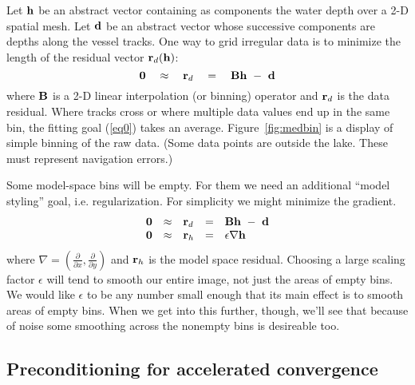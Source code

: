 Let $\bold{h}$ be an abstract vector containing as components
the water depth over a 2-D spatial mesh.
Let $\bold{d}$ be an abstract vector whose successive components
are depths along the vessel tracks.
One way to grid irregular data is to minimize the length 
of the residual vector $\bold r_d(\bold h)$:
\begin{equation}
	\bold 0 \quad\approx\quad \bold r_d \quad=\quad \bold B \bold h \ -\  \bold d    \label{eq0}
\end{equation}
where $\bold B$ is a 2-D linear interpolation (or binning) operator 
and $\bold r_d$ is the data residual.
Where tracks cross or where multiple data values end up in the same bin,
the fitting goal (\ref{eq0}) takes an average.
Figure~\ref{fig:medbin}
is a display of simple binning of the raw data.
(Some data points are outside the lake.
These must represent navigation errors.)


\par

Some model-space bins will be empty.
For them we need an additional ``model styling'' goal,
i.e. regularization.
For simplicity we might minimize the gradient.
\begin{equation}
  \begin{array}{lllll}
    \bold 0 &\approx& \bold r_d &=& \bold B \bold h \ -\  \bold d \\
    \bold 0 &\approx& \bold r_h &=& \epsilon \nabla \bold h 
  \end{array} \label{eq1}
\end{equation}
where $\nabla=\left ( \frac{\partial}{\partial x},
\frac{\partial}{\partial y}\right)$ and $\bold r_h$ is the model space
residual.
Choosing a large scaling factor $\epsilon$ will tend to smooth
our entire image, not just the areas of empty bins.
We would like $\epsilon$ to be any number small enough
that its main effect is to smooth areas of empty bins.
When we get into this further, though, we'll see that
because of noise
some smoothing across the nonempty bins is desireable too.


\subsection{Preconditioning for accelerated convergence}

